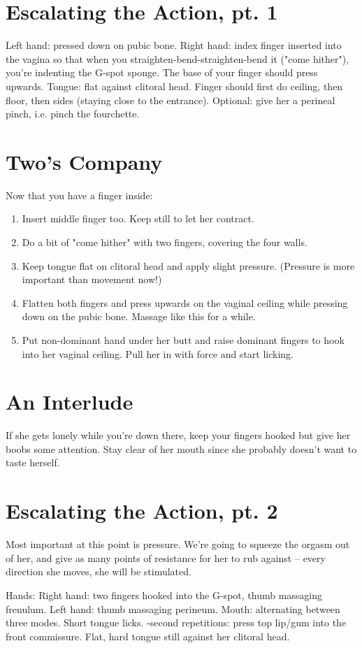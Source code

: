 \section{Escalating the Action, pt. 1}
\begin{outline}
\1 Left hand: pressed down on pubic bone.
\1 Right hand: index finger inserted into the vagina so that when you straighten-bend-straighten-bend it ("come hither"), you're indenting the G-spot sponge. The base of your finger should press upwards.
\1 Tongue: flat against clitoral head.
\1 Finger should first do ceiling, then floor, then sides (staying close to the entrance).
\1 Optional: give her a perineal pinch, i.e. pinch the fourchette.
\end{outline}

\section{Two's Company}
Now that you have a finger inside:
\begin{enumerate}
	\item Insert middle finger too. Keep still to let her contract.
	\item Do a bit of "come hither" with two fingers, covering the four walls.
	\item Keep tongue flat on clitoral head and apply slight pressure. (Pressure is more important than movement now!)
	\item Flatten both fingers and press upwards on the vaginal ceiling while pressing down on the pubic bone. Massage like this for a while.
	\item Put non-dominant hand under her butt and raise dominant fingers to hook into her vaginal ceiling. Pull her in with force and start licking.
\end{enumerate}

\section{An Interlude}
\begin{outline}
\1 If she gets lonely while you're down there, keep your fingers hooked but give her boobs some attention.
\1 Stay clear of her mouth since she probably doesn't want to taste herself.
\end{outline}

\section{Escalating the Action, pt. 2}
Most important at this point is pressure. We're going to squeeze the orgasm out of her, and give as many points of resistance for her to rub against -- every direction she moves, she will be stimulated.
\begin{outline}
\1 Hands:
	\2 Right hand: two fingers hooked into the G-spot, thumb massaging frenulum.
	\2 Left hand: thumb massaging perineum.
\1 Mouth: alternating between three modes.
	\2 Short tongue licks.
	-second repetitions: press top lip/gum into the front commissure.
	\2 Flat, hard tongue still against her clitoral head.
\end{outline}


